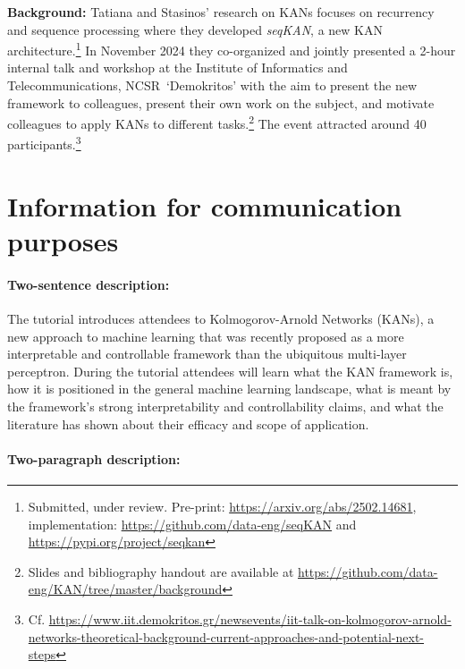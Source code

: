 \documentclass{ecai}
\newcommand{\quotes}[1]{`#1'}
\newcommand{\iit}{Institute of Informatics and Telecommunications, NCSR~\quotes{Demokritos}\xspace}
\begin{document}
\noindent
\textbf{Background:}
%
Tatiana and Stasinos' research on KANs focuses on recurrency and
sequence processing where they developed \emph{seqKAN}, a new KAN
architecture.\footnote{Submitted, under review.
  Pre-print: \url{https://arxiv.org/abs/2502.14681},
  implementation: \url{https://github.com/data-eng/seqKAN}
  and \url{https://pypi.org/project/seqkan}}
%
In November 2024 they co-organized and jointly presented a 2-hour
internal talk and workshop at the \iit with the aim to present the new
framework to colleagues, present their own work on the subject, and
motivate colleagues to apply KANs to different tasks.\footnote{Slides
and bibliography handout are available at
  \url{https://github.com/data-eng/KAN/tree/master/background}}
The event attracted around 40 participants.\footnote{Cf. 
  \url{https://www.iit.demokritos.gr/newsevents/iit-talk-on-kolmogorov-arnold-networks-theoretical-background-current-approaches-and-potential-next-steps}}


\newpage
\section{Information for communication purposes}


\paragraph{Two-sentence description:}

The tutorial introduces attendees to Kolmogorov-Arnold Networks
(KANs), a new approach to machine learning that was recently proposed
as a more interpretable and controllable framework than the ubiquitous
multi-layer perceptron. During the tutorial attendees will learn what
the KAN framework is, how it is positioned in the general machine
learning landscape, what is meant by the framework's strong
interpretability and controllability claims, and what the literature has
shown about their efficacy and scope of application.



\paragraph{Two-paragraph description:}
\end{document}
